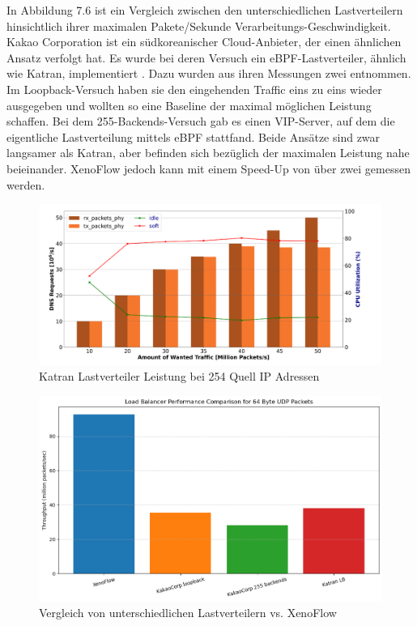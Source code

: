 In Abbildung 7.6 ist ein Vergleich zwischen den unterschiedlichen Lastverteilern hinsichtlich ihrer maximalen Pakete/Sekunde Verarbeitungs-Geschwindigkeit. Kakao Corporation ist ein südkoreanischer Cloud-Anbieter, der einen ähnlichen Ansatz verfolgt hat. Es wurde bei deren Versuch ein eBPF-Lastverteiler, ähnlich wie Katran, implementiert \cite{lee2021high}. Dazu wurden aus ihren Messungen zwei entnommen. Im Loopback-Versuch haben sie den eingehenden Traffic eins zu eins wieder ausgegeben und wollten so eine Baseline der maximal möglichen Leistung schaffen. Bei dem 255-Backends-Versuch gab es einen VIP-Server, auf dem die eigentliche Lastverteilung mittels eBPF stattfand. Beide Ansätze sind zwar langsamer als Katran, aber befinden sich bezüglich der maximalen Leistung nahe beieinander. XenoFlow jedoch kann mit einem Speed-Up von über zwei gemessen werden.
\begin{figure}
    \centering
    \includegraphics[width=1\linewidth]{images/katran_performance.png}
    \caption{Katran Lastverteiler Leistung bei 254 Quell IP Adressen \cite{ungrund}}
    \label{fig:enter-label}
\end{figure}
\begin{figure}
    \centering
    \includegraphics[width=1\linewidth]{images/lb_comp.png}
    \caption{Vergleich von unterschiedlichen Lastverteilern vs. XenoFlow \cite{lee2021high}\cite{ungrund}}
    \label{fig:enter-label}
\end{figure}
